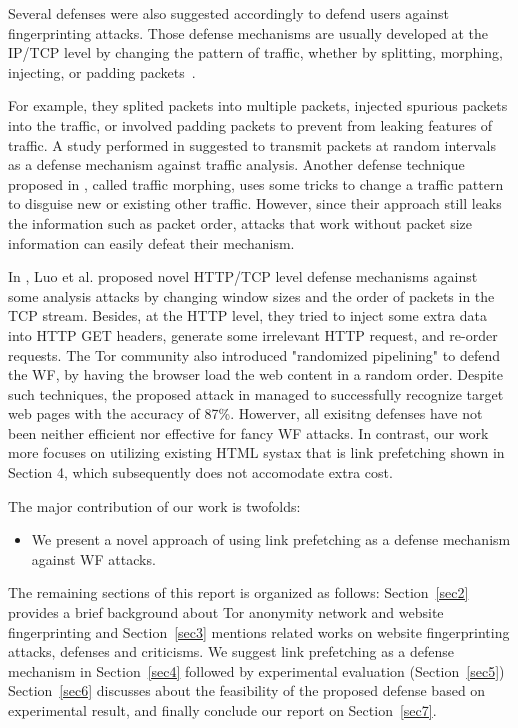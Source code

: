 Several defenses were also suggested accordingly to defend users against fingerprinting attacks.
Those defense mechanisms are usually developed at the IP/TCP level by changing the pattern of traffic, whether by splitting, morphing, injecting, or padding packets~\cite{luo2011}.

For example, they splited packets into multiple packets, injected spurious packets into the traffic, or involved  padding packets to prevent from leaking features of traffic.
A study performed in \cite{fu2003} suggested to transmit packets at random intervals as a defense mechanism against traffic analysis.
Another defense technique proposed in \cite{wright2009}, called traffic morphing, uses some tricks to change a traffic pattern to disguise new or existing other traffic.
However, since their approach still leaks the information such as packet order, attacks that work without packet size information can easily defeat their mechanism.

In \cite{luo2011}, Luo et al. proposed novel HTTP/TCP level defense mechanisms against some analysis attacks by changing window sizes and the order of packets in the TCP stream.
Besides, at the HTTP level, they tried to inject some extra data into HTTP GET headers, generate some irrelevant HTTP request, and re-order requests.
The Tor community also introduced "randomized pipelining" \cite{perry11} to defend the WF, by having the browser load the web content in a random order.
Despite such techniques, the proposed attack in \cite{cai2012touching} managed to successfully recognize target web pages with the accuracy of 87\%. 
Howerver, all exisitng defenses have not been neither efficient nor effective for fancy WF attacks. %
In contrast, our work more focuses on utilizing existing HTML systax that is link prefetching shown in Section 4, which subsequently does not accomodate extra cost.



The major contribution of our work is twofolds:
\begin{itemize}
\item
We present a novel approach of using link prefetching as a defense mechanism against WF attacks.
\end{itemize}

The remaining sections of this report is organized as follows: Section~\ref{sec2} provides a brief background about Tor anonymity network and website fingerprinting and Section~\ref{sec3} mentions related works on website fingerprinting attacks, defenses and criticisms.
We suggest link prefetching as a defense mechanism in Section~\ref{sec4} followed by experimental evaluation (Section~\ref{sec5})
Section~\ref{sec6} discusses about the feasibility of the proposed defense based on experimental result, and finally conclude our report on Section~\ref{sec7}.

